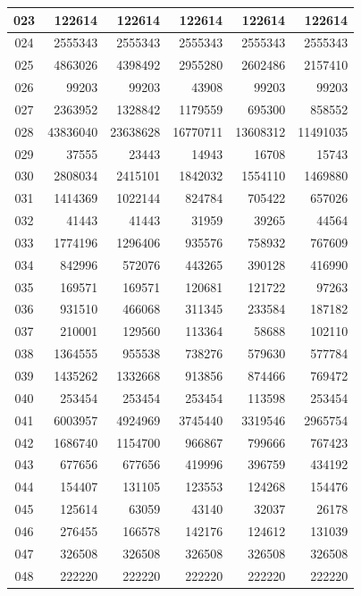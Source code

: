 \begin{longtable}{|c|r|r|r|r|r|}
\hline
023 & 122614 & 122614 & 122614 & 122614 & 122614 \\
\hline
024 & 2555343 & 2555343 & 2555343 & 2555343 & 2555343 \\
\hline
025 & 4863026 & 4398492 & 2955280 & 2602486 & 2157410 \\
\hline
026 & 99203 & 99203 & 43908 & 99203 & 99203 \\
\hline
027 & 2363952 & 1328842 & 1179559 & 695300 & 858552 \\
\hline
028 & 43836040 & 23638628 & 16770711 & 13608312 & 11491035 \\
\hline
029 & 37555 & 23443 & 14943 & 16708 & 15743 \\
\hline
030 & 2808034 & 2415101 & 1842032 & 1554110 & 1469880 \\
\hline
031 & 1414369 & 1022144 & 824784 & 705422 & 657026 \\
\hline
032 & 41443 & 41443 & 31959 & 39265 & 44564 \\
\hline
033 & 1774196 & 1296406 & 935576 & 758932 & 767609 \\
\hline
034 & 842996 & 572076 & 443265 & 390128 & 416990 \\
\hline
035 & 169571 & 169571 & 120681 & 121722 & 97263 \\
\hline
036 & 931510 & 466068 & 311345 & 233584 & 187182 \\
\hline
037 & 210001 & 129560 & 113364 & 58688 & 102110 \\
\hline
038 & 1364555 & 955538 & 738276 & 579630 & 577784 \\
\hline
039 & 1435262 & 1332668 & 913856 & 874466 & 769472 \\
\hline
040 & 253454 & 253454 & 253454 & 113598 & 253454 \\
\hline
041 & 6003957 & 4924969 & 3745440 & 3319546 & 2965754 \\
\hline
042 & 1686740 & 1154700 & 966867 & 799666 & 767423 \\
\hline
043 & 677656 & 677656 & 419996 & 396759 & 434192 \\
\hline
044 & 154407 & 131105 & 123553 & 124268 & 154476 \\
\hline
045 & 125614 & 63059 & 43140 & 32037 & 26178 \\
\hline
046 & 276455 & 166578 & 142176 & 124612 & 131039 \\
\hline
047 & 326508 & 326508 & 326508 & 326508 & 326508 \\
\hline
048 & 222220 & 222220 & 222220 & 222220 & 222220 \\
\hline

\end{longtable}
